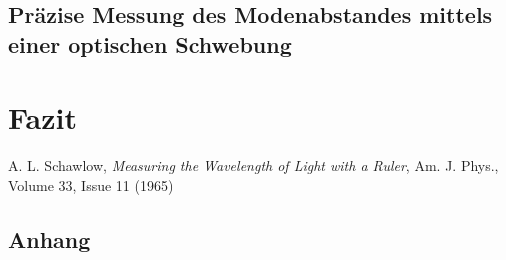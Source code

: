 \documentclass[11pt, a4paper]{article}
\numberwithin{equation}{section}
\begin{document}
\subsection{Präzise Messung des Modenabstandes mittels einer optischen Schwebung}

\section{Fazit}


\vspace{\fill}
\begin{thebibliography}{9}
	A. L. Schawlow,
	\emph{Measuring the Wavelength of Light with a Ruler},
	Am. J. Phys., Volume 33, Issue 11 (1965)
 
\end{thebibliography}

\clearpage

\begin{appendix}
\section{Anhang}


\end{appendix}
\end{document}

